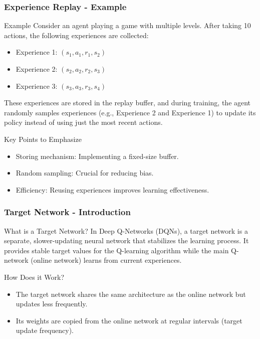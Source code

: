 \documentclass[aspectratio=169]{beamer}
\begin{document}
\begin{frame}[fragile]
  \frametitle{Experience Replay - Example}
  \begin{block}{Example}
    Consider an agent playing a game with multiple levels. After taking 10 actions, the following experiences are collected:
    \begin{itemize}
      \item Experience 1: \( (s_1, a_1, r_1, s_2) \)
      \item Experience 2: \( (s_2, a_2, r_2, s_3) \)
      \item Experience 3: \( (s_3, a_3, r_3, s_4) \)
    \end{itemize}
    These experiences are stored in the replay buffer, and during training, the agent randomly samples experiences (e.g., Experience 2 and Experience 1) to update its policy instead of using just the most recent actions.
  \end{block}
  
  \begin{block}{Key Points to Emphasize}
    \begin{itemize}
      \item Storing mechanism: Implementing a fixed-size buffer.
      \item Random sampling: Crucial for reducing bias.
      \item Efficiency: Reusing experiences improves learning effectiveness.
    \end{itemize}
  \end{block}
\end{frame}

\begin{frame}[fragile]
    \frametitle{Target Network - Introduction}
    \begin{block}{What is a Target Network?}
        In Deep Q-Networks (DQNs), a target network is a separate, slower-updating neural network that stabilizes the learning process. It provides stable target values for the Q-learning algorithm while the main Q-network (online network) learns from current experiences.
    \end{block}
    
    \begin{block}{How Does it Work?}
        \begin{itemize}
            \item The target network shares the same architecture as the online network but updates less frequently.
            \item Its weights are copied from the online network at regular intervals (target update frequency).
        \end{itemize}
    \end{block}
\end{frame}
\end{document}
